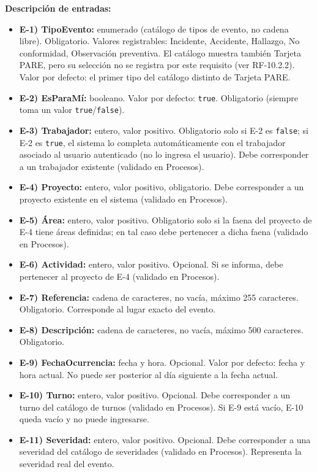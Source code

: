 \textbf{Descripci\'on de entradas:}
\begin{itemize}[label={}, leftmargin=1.5em]
  \item \textbf{E-1) TipoEvento:} enumerado (cat\'alogo de tipos de evento, no cadena libre). Obligatorio. Valores registrables: Incidente, Accidente, Hallazgo, No conformidad, Observaci\'on preventiva. El cat\'alogo muestra tambi\'en Tarjeta PARE, pero su selecci\'on no se registra por este requisito (ver RF-10.2.2). Valor por defecto: el primer tipo del cat\'alogo distinto de Tarjeta PARE.
  \item \textbf{E-2) EsParaM\'i:} booleano. Valor por defecto: \texttt{true}. Obligatorio (siempre toma un valor \texttt{true}/\texttt{false}).
  \item \textbf{E-3) Trabajador:} entero, valor positivo. Obligatorio solo si E-2 es \texttt{false}; si E-2 es \texttt{true}, el sistema lo completa autom\'aticamente con el trabajador asociado al usuario autenticado (no lo ingresa el usuario). Debe corresponder a un trabajador existente (validado en Procesos).
  \item \textbf{E-4) Proyecto:} entero, valor positivo, obligatorio. Debe corresponder a un proyecto existente en el sistema (validado en Procesos).
  \item \textbf{E-5) \'Area:} entero, valor positivo. Obligatorio solo si la faena del proyecto de E-4 tiene \'areas definidas; en tal caso debe pertenecer a dicha faena (validado en Procesos).
  \item \textbf{E-6) Actividad:} entero, valor positivo. Opcional. Si se informa, debe pertenecer al proyecto de E-4 (validado en Procesos).
  \item \textbf{E-7) Referencia:} cadena de caracteres, no vac\'ia, m\'aximo 255 caracteres. Obligatorio. Corresponde al lugar exacto del evento.
  \item \textbf{E-8) Descripci\'on:} cadena de caracteres, no vac\'ia, m\'aximo 500 caracteres. Obligatorio.
  \item \textbf{E-9) FechaOcurrencia:} fecha y hora. Opcional. Valor por defecto: fecha y hora actual. No puede ser posterior al d\'ia siguiente a la fecha actual.
  \item \textbf{E-10) Turno:} entero, valor positivo. Opcional. Debe corresponder a un turno del cat\'alogo de turnos (validado en Procesos). Si E-9 est\'a vac\'io, E-10 queda vac\'io y no puede ingresarse.
  \item \textbf{E-11) Severidad:} entero, valor positivo. Opcional. Debe corresponder a una severidad del cat\'alogo de severidades (validado en Procesos). Representa la severidad real del evento.

\end{itemize}
